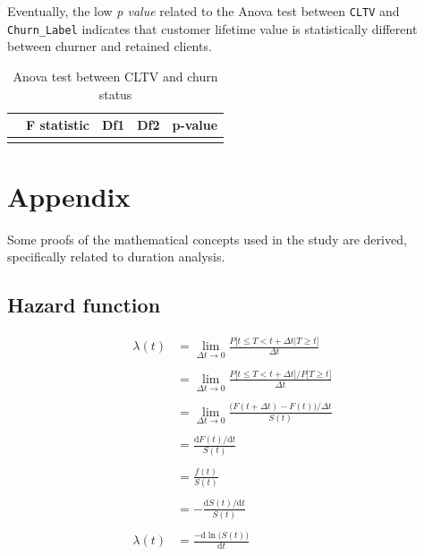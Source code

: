 \documentclass[
]{book}
\begin{document}
Eventually, the low \emph{p value} related to the Anova test between \texttt{CLTV} and \texttt{Churn\_Label} indicates that customer lifetime value is statistically different between churner and retained clients.

\begin{table}[H]

\caption{\label{tab:aovcltvchurn}Anova test between CLTV and churn status}
\centering
\begin{tabular}[t]{lrrrl}
\toprule
  & F statistic & Df1 & Df2 & p-value\\
\midrule
\cellcolor{gray!6}{Churn\_Label} & \cellcolor{gray!6}{117.57} & \cellcolor{gray!6}{1} & \cellcolor{gray!6}{7030} & \cellcolor{gray!6}{3.5e-27}\\
\bottomrule
\end{tabular}
\end{table}

\hypertarget{appendix}{%
\chapter*{Appendix}\label{appendix}}

Some proofs of the mathematical concepts used in the study are derived, specifically related to duration analysis.

\hypertarget{hazard-function}{%
\section*{Hazard function}\label{hazard-function}}

\begin{equation}    
  \begin{aligned}
  \lambda(t) & = \lim_{\Delta t \to 0} \frac{P\big[t \leq T < t + \Delta t | T \geq t \big]}{\Delta t} \\\\
  & = \lim_{\Delta t \to 0} \frac{P\big[t \leq T < t + \Delta t \big] / P\big[T \geq t  \big]}{\Delta t} \\\\
  & = \lim_{\Delta t \to 0} \frac{\big(F(t+\Delta t)-F(t)\big) / \Delta t}{S(t)} \\\\
  & = \frac{\text{d} F(t) / \text{d} t}{S(t)} \\\\
  & = \frac{f(t)}{S(t)} \\\\
  & = - \frac{\text{d}S(t) / \text{d} t}{S(t)} \\\\
  \lambda(t) & = \frac{-\text{d} \ln \big(S(t)\big)}{\text{d} t}
  \end{aligned}
  \label{eq:hazfunproof}
\end{equation}
\end{document}
